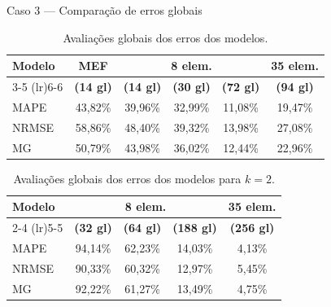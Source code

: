 \documentclass[aspectratio=169]{beamer}
\begin{document}
{\begin{frame}{Caso 3 --- Comparação de erros globais}
  \begin{table}[htbp]
        \centering
        \caption{Avaliações globais dos erros dos modelos.}
        \small %
        \begin{tabular}{lccccc}
            \toprule
            \multirow{2}{*}{\textbf{Modelo}} & \textbf{MEF} & \multicolumn{3}{c}{\textbf{8 elem.}} & \textbf{35 elem.} \\
            \cmidrule(lr){3-5} \cmidrule(lr){6-6}
            & \textbf{(14 gl)} & \textbf{(14 gl)} & \textbf{(30 gl)} & \textbf{(72 gl)} & \textbf{(94 gl)} \\
            \midrule
            MAPE  & 43,82\% & 39,96\% & 32,99\% & 11,08\% & 19,47\% \\
            NRMSE & 58,86\% & 48,40\% & 39,32\% & 13,98\% & 27,08\% \\
            MG    & 50,79\% & 43,98\% & 36,02\% & 12,44\% & 22,96\% \\
            \bottomrule
        \end{tabular}
      \end{table}
      \begin{table}[htbp]
        \centering
        \caption{Avaliações globais dos erros dos modelos para $k=2$.}
        \small %
        \begin{tabular}{lcccc}
            \toprule
            \multirow{2}{*}{\textbf{Modelo}} & \multicolumn{3}{c}{\textbf{8 elem.}} & \textbf{35 elem.} \\
            \cmidrule(lr){2-4} \cmidrule(lr){5-5}
            & \textbf{(32 gl)} & \textbf{(64 gl)} & \textbf{(188 gl)} & \textbf{(256 gl)} \\
            \midrule
            MAPE  & 94,14\% & 62,23\% & 14,03\% & 4,13\% \\
            NRMSE & 90,33\% & 60,32\% & 12,97\% & 5,45\% \\
            MG    & 92,22\% & 61,27\% & 13,49\% & 4,75\% \\
            \bottomrule
        \end{tabular}
      \end{table}
\end{frame}

}
\end{document}
